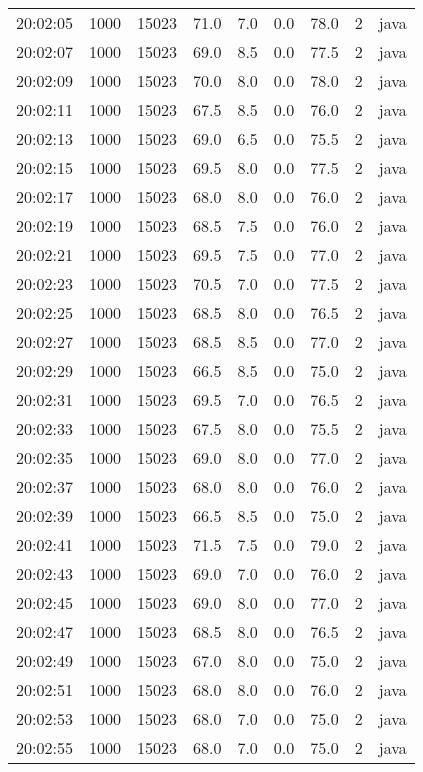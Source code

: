 \documentclass[11pt]{article}
\begin{document}
\begin{table}[htbp]
\begin{tabular}{rrrrrrrrl}
20:02:05 & 1000 & 15023 & 71.0 & 7.0 & 0.0 & 78.0 & 2 & java\\
20:02:07 & 1000 & 15023 & 69.0 & 8.5 & 0.0 & 77.5 & 2 & java\\
20:02:09 & 1000 & 15023 & 70.0 & 8.0 & 0.0 & 78.0 & 2 & java\\
20:02:11 & 1000 & 15023 & 67.5 & 8.5 & 0.0 & 76.0 & 2 & java\\
20:02:13 & 1000 & 15023 & 69.0 & 6.5 & 0.0 & 75.5 & 2 & java\\
20:02:15 & 1000 & 15023 & 69.5 & 8.0 & 0.0 & 77.5 & 2 & java\\
20:02:17 & 1000 & 15023 & 68.0 & 8.0 & 0.0 & 76.0 & 2 & java\\
20:02:19 & 1000 & 15023 & 68.5 & 7.5 & 0.0 & 76.0 & 2 & java\\
20:02:21 & 1000 & 15023 & 69.5 & 7.5 & 0.0 & 77.0 & 2 & java\\
20:02:23 & 1000 & 15023 & 70.5 & 7.0 & 0.0 & 77.5 & 2 & java\\
20:02:25 & 1000 & 15023 & 68.5 & 8.0 & 0.0 & 76.5 & 2 & java\\
20:02:27 & 1000 & 15023 & 68.5 & 8.5 & 0.0 & 77.0 & 2 & java\\
20:02:29 & 1000 & 15023 & 66.5 & 8.5 & 0.0 & 75.0 & 2 & java\\
20:02:31 & 1000 & 15023 & 69.5 & 7.0 & 0.0 & 76.5 & 2 & java\\
20:02:33 & 1000 & 15023 & 67.5 & 8.0 & 0.0 & 75.5 & 2 & java\\
20:02:35 & 1000 & 15023 & 69.0 & 8.0 & 0.0 & 77.0 & 2 & java\\
20:02:37 & 1000 & 15023 & 68.0 & 8.0 & 0.0 & 76.0 & 2 & java\\
20:02:39 & 1000 & 15023 & 66.5 & 8.5 & 0.0 & 75.0 & 2 & java\\
20:02:41 & 1000 & 15023 & 71.5 & 7.5 & 0.0 & 79.0 & 2 & java\\
20:02:43 & 1000 & 15023 & 69.0 & 7.0 & 0.0 & 76.0 & 2 & java\\
20:02:45 & 1000 & 15023 & 69.0 & 8.0 & 0.0 & 77.0 & 2 & java\\
20:02:47 & 1000 & 15023 & 68.5 & 8.0 & 0.0 & 76.5 & 2 & java\\
20:02:49 & 1000 & 15023 & 67.0 & 8.0 & 0.0 & 75.0 & 2 & java\\
20:02:51 & 1000 & 15023 & 68.0 & 8.0 & 0.0 & 76.0 & 2 & java\\
20:02:53 & 1000 & 15023 & 68.0 & 7.0 & 0.0 & 75.0 & 2 & java\\
20:02:55 & 1000 & 15023 & 68.0 & 7.0 & 0.0 & 75.0 & 2 & java\\

\end{tabular}
\end{table}
\end{document}
